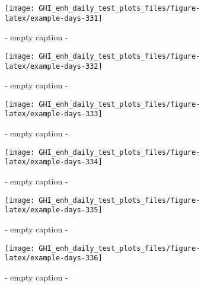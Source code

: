 \documentclass[
  10pt,
  a4paper,oneside]{article}
\begin{document}
\begin{figure}[H]

{\centering \texttt{[image: GHI\_enh\_daily\_test\_plots\_files/figure-latex/example-days-331]} 

}

\caption{ - empty caption - }\label{fig:example-days-331}
\end{figure}

\begin{figure}[H]

{\centering \texttt{[image: GHI\_enh\_daily\_test\_plots\_files/figure-latex/example-days-332]} 

}

\caption{ - empty caption - }\label{fig:example-days-332}
\end{figure}

\begin{figure}[H]

{\centering \texttt{[image: GHI\_enh\_daily\_test\_plots\_files/figure-latex/example-days-333]} 

}

\caption{ - empty caption - }\label{fig:example-days-333}
\end{figure}

\begin{figure}[H]

{\centering \texttt{[image: GHI\_enh\_daily\_test\_plots\_files/figure-latex/example-days-334]} 

}

\caption{ - empty caption - }\label{fig:example-days-334}
\end{figure}

\begin{figure}[H]

{\centering \texttt{[image: GHI\_enh\_daily\_test\_plots\_files/figure-latex/example-days-335]} 

}

\caption{ - empty caption - }\label{fig:example-days-335}
\end{figure}

\begin{figure}[H]

{\centering \texttt{[image: GHI\_enh\_daily\_test\_plots\_files/figure-latex/example-days-336]} 

}

\caption{ - empty caption - }\label{fig:example-days-336}
\end{figure}
\end{document}
